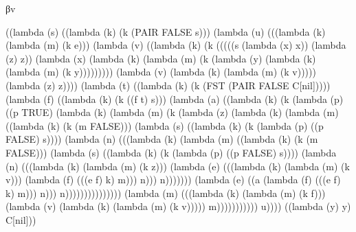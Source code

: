 \documentclass[ms,electronic,twosidetoc,letterpaper,chaptercenter,parttop]{byumsphd}
\begin{document}
\begin{theorem}
βv
\begin{schemedisplay}
((lambda (s) ((lambda (k) (k (PAIR FALSE s)))
        (lambda (u) (((lambda (k) (lambda (m) (k e)))
                (lambda (v) ((lambda (k) (k (((((s (lambda (x) x)) (lambda (z) z))
                                   (lambda (x) (lambda (k) (lambda (m) (k (lambda (y) (lambda (k) (lambda (m) (k y)))))))))
                                  (lambda (v) (lambda (k) (lambda (m) (k v))))) (lambda (z) z))))
                       (lambda (t) ((lambda (k) (k (FST
                                        (PAIR FALSE C[nil]))))
                              (lambda (f) ((lambda (k) (k ((f t) s)))
                                     (lambda (a) ((lambda (k) (k (lambda (p) ((p TRUE)
                                                            (lambda (k) (lambda (m) (k (lambda (z) (lambda (k) (lambda (m) ((lambda (k) (k (m FALSE)))
                                                                                              (lambda (s) ((lambda (k) (k (lambda (p) ((p FALSE) s))))
                                                                                                     (lambda (n) (((lambda (k) (lambda (m) ((lambda (k) (k (m FALSE)))
                                                                                                                          (lambda (s) ((lambda (k) (k (lambda (p) ((p FALSE) s))))
                                                                                                                                 (lambda (n) (((lambda (k) (lambda (m) (k z)))
                                                                                                                                         (lambda (e) (((lambda (k) (lambda (m) (k v)))
                                                                                                                                                 (lambda (f) (((e f) k) m))) n))) n)))))))
                                                                                                             (lambda (e) ((a (lambda (f) (((e f) k) m))) n))) n)))))))))))))))
                                            (lambda (m) (((lambda (k) (lambda (m) (k f)))
                                                    (lambda (v) (lambda (k) (lambda (m) (k v))))) m))))))))))) u))))
 ((lambda (y) y) C[nil]))
\end{schemedisplay}


\end{theorem}
\end{document}
